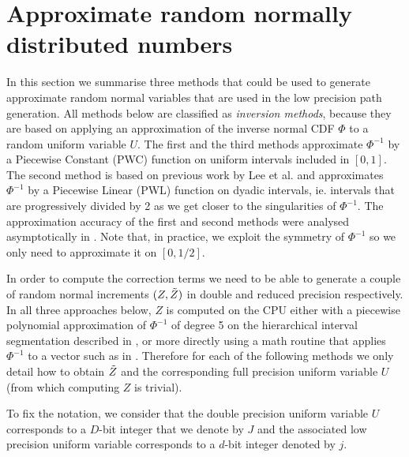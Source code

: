 \section{Approximate random normally distributed numbers} \label{sec:RNG}
In this section we summarise three methods that could be used to generate approximate random normal variables that are used in the low precision path generation. 
All methods below are classified as \textit{inversion methods}, because they are based on applying an approximation of the inverse normal CDF $\Phi$ to a random uniform variable $U$. The first and the third methods approximate $\Phi^{-1}$ by a Piecewise Constant (PWC) function on uniform intervals included in $[0,1]$. The second method is based on previous work by Lee et al. \cite{Cheung2007HardwareGO, Lee_segmentation} and approximates $\Phi^{-1}$ by a Piecewise Linear (PWL) function on dyadic intervals, ie. intervals that are progressively divided by 2 as we get closer to the singularities of $\Phi^{-1}$. The approximation accuracy of the first and second methods were analysed asymptotically in \cite{approximateICDF_Oliver}. Note that, in practice, we exploit the symmetry of $\Phi^{-1}$ so we only need to approximate it on $[0,1/2]$.

In order to compute the correction terms we need to be able to generate a couple of random normal increments $(Z,\Tilde{Z})$ in double and reduced precision respectively.
In all three approaches below, $Z$ is computed on the CPU either with a piecewise polynomial approximation of $\Phi^{-1}$ of degree 5 on the hierarchical interval segmentation described in \cite{Cheung2007HardwareGO}, or more directly using a math routine that applies $\Phi^{-1}$ to a vector such as in \cite{norminv_routine_intel}. Therefore for each of the following methods we only detail how to obtain $\Tilde{Z}$ and the corresponding full precision uniform variable $U$ (from which computing $Z$ is trivial).

To fix the notation, we consider that the double precision uniform variable $U$ corresponds to a $D$-bit integer that we denote by $J$ and the associated low precision uniform variable corresponds to a $d$-bit integer denoted by $j$.

